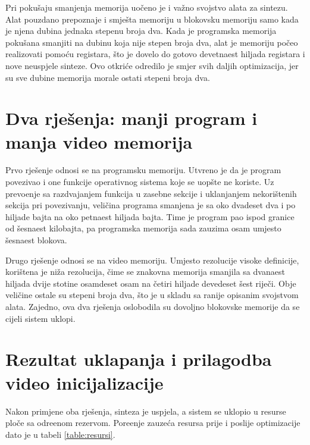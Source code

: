 Pri poku\v{s}aju smanjenja memorija uo\v{c}eno je i va\v{z}no svojstvo alata za
sintezu. Alat pouzdano prepoznaje i smje\v{s}ta memoriju u blokovsku memoriju
samo kada je njena dubina jednaka stepenu broja dva. Kada je programska memorija
poku\v{s}ana smanjiti na dubinu koja nije stepen broja dva, alat je memoriju
po\v{c}eo realizovati pomo\'cu registara, \v{s}to je dovelo do gotovo devetnaest
hiljada registara i nove neuspjele sinteze. Ovo otkri\'ce odredilo je smjer
svih daljih optimizacija, jer su sve dubine memorija morale ostati stepeni broja
dva.

\section{Dva rje\v{s}enja: manji program i manja video memorija}
\label{sec:uklapanje-rjesenja}

Prvo rje\v{s}enje odnosi se na programsku memoriju. Utvr\dj{}eno je da je program
povezivao i one funkcije operativnog sistema koje se uop\v{s}te ne koriste. Uz
prevo\dj{}enje sa razdvajanjem funkcija u zasebne sekcije i uklanjanjem
nekori\v{s}tenih sekcija pri povezivanju, veli\v{c}ina programa smanjena je sa
oko dvadeset dva i po hiljade bajta na oko petnaest hiljada bajta. Time je
program pao ispod granice od \v{s}esnaest kilobajta, pa programska memorija sada
zauzima osam umjesto \v{s}esnaest blokova.

Drugo rje\v{s}enje odnosi se na video memoriju. Umjesto rezolucije visoke
definicije, kori\v{s}tena je ni\v{z}a rezolucija, \v{c}ime se znakovna memorija
smanjila sa dvanaest hiljada dvije stotine osamdeset osam na \v{c}etiri hiljade
devedeset \v{s}est rije\v{c}i. Obje veli\v{c}ine ostale su stepeni broja dva,
\v{s}to je u skladu sa ranije opisanim svojstvom alata. Zajedno, ova dva
rje\v{s}enja oslobodila su dovoljno blokovske memorije da se cijeli sistem
uklopi.

\section{Rezultat uklapanja i prilagodba video inicijalizacije}
\label{sec:uklapanje-rezultat}

Nakon primjene oba rje\v{s}enja, sinteza je uspjela, a sistem se uklopio u
resurse plo\v{c}e sa odre\dj{}enom rezervom. Pore\dj{}enje zauze\'ca resursa prije
i poslije optimizacije dato je u tabeli \ref{table:resursi}.

